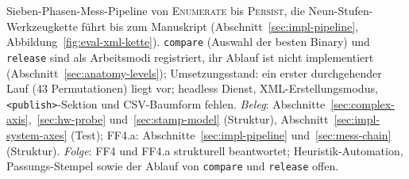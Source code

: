 \begin{nurkurz}
Sieben-Phasen-Mess-Pipeline von \textsc{Enumerate} bis \textsc{Persist}, die Neun-Stufen-Werkzeugkette
führt bis zum Manuskript (Abschnitt~\ref{sec:impl-pipeline}, Abbildung~\ref{fig:eval-xml-kette}).
\texttt{compare} (Auswahl der besten Binary) und \texttt{release} sind als Arbeitsmodi registriert, ihr
Ablauf ist nicht implementiert (Abschnitt~\ref{sec:anatomy-levels}); Umsetzungsstand: ein erster
durchgehender Lauf (43 Permutationen) liegt vor; headless Dienst, XML-Erstellungsmodus,
\texttt{<publish>}-Sektion und CSV-Baumform fehlen.
\emph{Beleg}: Abschnitte~\ref{sec:complex-axis},~\ref{sec:hw-probe} und~\ref{sec:stamp-model} (Struktur),
Abschnitt~\ref{sec:impl-system-axes} (Test); FF4.a: Abschnitte~\ref{sec:impl-pipeline}
und~\ref{sec:mess-chain} (Struktur).
\emph{Folge}: FF4 und FF4.a strukturell beantwortet; Heuristik-Automation, Passungs-Stempel sowie der Ablauf
von \texttt{compare} und \texttt{release} offen.
\end{nurkurz}

